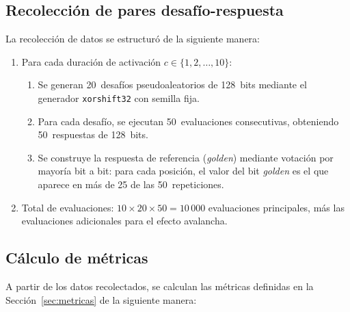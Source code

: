 \subsection{Recolección de pares desafío-respuesta}
\label{sec:crp_collect}

La recolección de datos se estructuró de la siguiente manera:

\begin{enumerate}
  \item Para cada duración de activación $c \in \{1, 2, \ldots, 10\}$:
  \begin{enumerate}
    \item Se generan 20~desafíos pseudoaleatorios de 128~bits mediante el
      generador \texttt{xorshift32} con semilla fija.
    \item Para cada desafío, se ejecutan 50~evaluaciones consecutivas,
      obteniendo 50~respuestas de 128~bits.
    \item Se construye la respuesta de referencia (\textit{golden}) mediante
      votación por mayoría bit a bit: para cada posición, el valor del bit
      \textit{golden} es el que aparece en más de 25 de las 50~repeticiones.
  \end{enumerate}
  \item Total de evaluaciones: $10 \times 20 \times 50 = 10\,000$
    evaluaciones principales, más las evaluaciones adicionales para el efecto
    avalancha.
\end{enumerate}

\subsection{Cálculo de métricas}
\label{sec:metricas_calc}

A partir de los datos recolectados, se calculan las métricas definidas en
la Sección~\ref{sec:metricas} de la siguiente manera:

